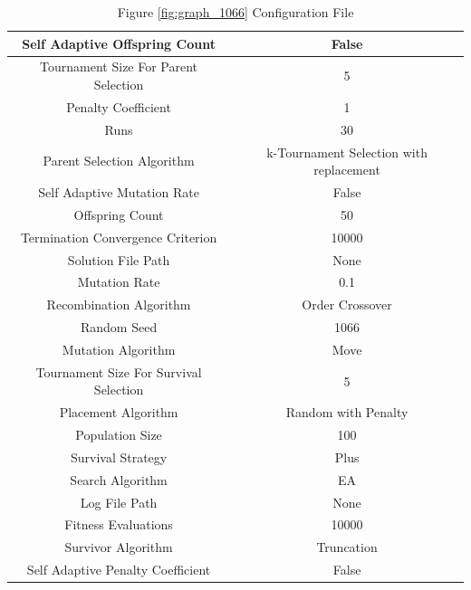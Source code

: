 \documentclass{standalone}
\begin{document}
\begin{table}[!htb]
	\centering
	\caption{Figure \ref{fig:graph_1066} Configuration File}
	\label{tab:graph_1066}
	\begin{tabular}{| c | c |}
		\hline
		Self Adaptive Offspring Count		& False		 \\
		\hline
		Tournament Size For Parent Selection		& 5		 \\
		\hline
		Penalty Coefficient		& 1		 \\
		\hline
		Runs		& 30		 \\
		\hline
		Parent Selection Algorithm		& k-Tournament Selection with replacement		 \\
		\hline
		Self Adaptive Mutation Rate		& False		 \\
		\hline
		Offspring Count		& 50		 \\
		\hline
		Termination Convergence Criterion		& 10000		 \\
		\hline
		Solution File Path		& None		 \\
		\hline
		Mutation Rate		& 0.1		 \\
		\hline
		Recombination Algorithm		& Order Crossover		 \\
		\hline
		Random Seed		& 1066		 \\
		\hline
		Mutation Algorithm		& Move		 \\
		\hline
		Tournament Size For Survival Selection		& 5		 \\
		\hline
		Placement Algorithm		& Random with Penalty		 \\
		\hline
		Population Size		& 100		 \\
		\hline
		Survival Strategy		& Plus		 \\
		\hline
		Search Algorithm		& EA		 \\
		\hline
		Log File Path		& None		 \\
		\hline
		Fitness Evaluations		& 10000		 \\
		\hline
		Survivor Algorithm		& Truncation		 \\
		\hline
		Self Adaptive Penalty Coefficient		& False		 \\
		\hline
	\end{tabular}
\end{table}
\end{document}
